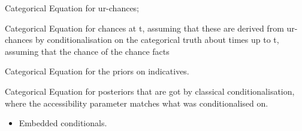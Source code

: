 \documentclass[leqno, 11pt, a5paper, openany]{article}
\begin{document}
\begin{prop}
\item
  Categorical Equation for ur-chances;
\item
  Categorical Equation for chances at t, assuming that these are derived
  from ur-chances by conditionalisation on the categorical truth about
  times up to t, assuming that the chance of the chance facts
\item
  Categorical Equation for the priors on indicatives.\\
\item
  Categorical Equation for posteriors that are got by classical
  conditionalisation, where the accessibility parameter matches what was
  conditionalised on.
\end{prop}

\begin{itemize}
\item
  Embedded conditionals.\\
\end{itemize}
\end{document}
